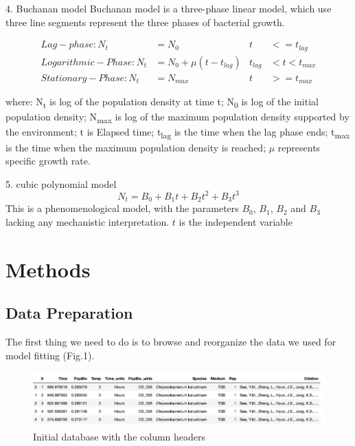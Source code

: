 \documentclass[11pt]{article}
\begin{document}
	4. Buchanan model
	Buchanan model is a three-phase linear model, which use three line segments represent the three phases of bacterial growth\citep{buchanan1997simple}.
	
	\begin{align}
    Lag-phase: N_{t} &= N_0          &  t &<=t_{lag}\\
    Logarithmic-Phase: N_{t} &= N_0 + \mu(t-t_{lag})         &  t_{lag}&< t < t_{max}\\
    Stationary-Phase: N_{t} &= N_{max}   &  t&>=t_{max}        
    \end{align}

    where: N\textsubscript{t} is log of the population density at time t; N\textsubscript{0} is log of the initial population density; N\textsubscript{max} is log of the maximum population density supported by the environment; t is Elapsed time; t\textsubscript{lag} is the time when the lag phase ends; t\textsubscript{max} is the time when the maximum population density is reached; $\mu$ represents specific growth rate\citep{buchanan1990mathematical}.
    
    5. cubic polynomial model
    \begin{equation}
	    N_{t}= B_0 + B_1t + B_2t^2 + B_3t^3
	\end{equation}
	This is a phenomenological model, with the parameters $B_0$, $B_1$, $B_2$ and $B_3$ lacking any mechanistic interpretation. $t$ is the independent variable
	
\section{Methods}
    \subsection{Data Preparation}
    The first thing we need to do is to browse and reorganize the data we used for model fitting (Fig.1).
    \begin{figure}[H]
            \centering
			\includegraphics[width = \textwidth]{../results/images/Fig1.png}
            \caption{Initial database with the column headers}
            \label{fig1}
    \end{figure}
    
\end{document}

